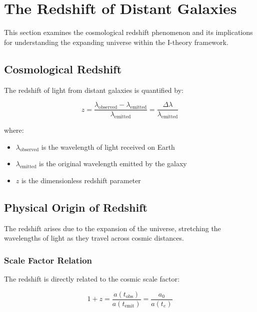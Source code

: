 \section{The Redshift of Distant Galaxies}
\label{sec:redshift}

This section examines the cosmological redshift phenomenon and its implications for understanding the expanding universe within the I-theory framework.

\subsection{Cosmological Redshift}
\label{subsec:cosmological_redshift}

The redshift of light from distant galaxies is quantified by:

\begin{equation}
\label{eq:redshift_definition}
z = \frac{\lambda_{\text{observed}} - \lambda_{\text{emitted}}}{\lambda_{\text{emitted}}} = \frac{\Delta\lambda}{\lambda_{\text{emitted}}}
\end{equation}

where:
\begin{itemize}
    \item $\lambda_{\text{observed}}$ is the wavelength of light received on Earth
    \item $\lambda_{\text{emitted}}$ is the original wavelength emitted by the galaxy
    \item $z$ is the dimensionless redshift parameter
\end{itemize}

\subsection{Physical Origin of Redshift}

The redshift arises due to the expansion of the universe, stretching the wavelengths of light as they travel across cosmic distances.

\subsubsection{Scale Factor Relation}

The redshift is directly related to the cosmic scale factor:

\begin{equation}
\label{eq:scale_factor_redshift}
1 + z = \frac{a(t_{\text{obs}})}{a(t_{\text{emit}})} = \frac{a_0}{a(t_e)}
\end{equation}

